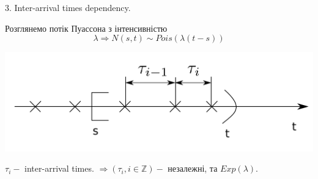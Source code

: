 \documentclass[14pt,a4paper]{scrartcl}
\theoremstyle{definition}
\theoremstyle{remark}
\theoremstyle{definition}
\theoremstyle{definition}
\begin{document}
3. Inter-arrival times dependency.
\begin{boxteo}
Розглянемо потік Пуассона з інтенсивністю
 $$\lambda \Rightarrow  N(s,t) \sim Pois(\lambda(t-s)) $$
\begin{center} \includegraphics[scale=0.3]{images/4.png} \end{center}
$\tau_i - $ inter-arrival times.
 $ \Rightarrow\left( \tau_i , i \in \mathbb{Z} \right) - $ незалежні, та $Exp(\lambda).$
\end{boxteo}
\end{document}
